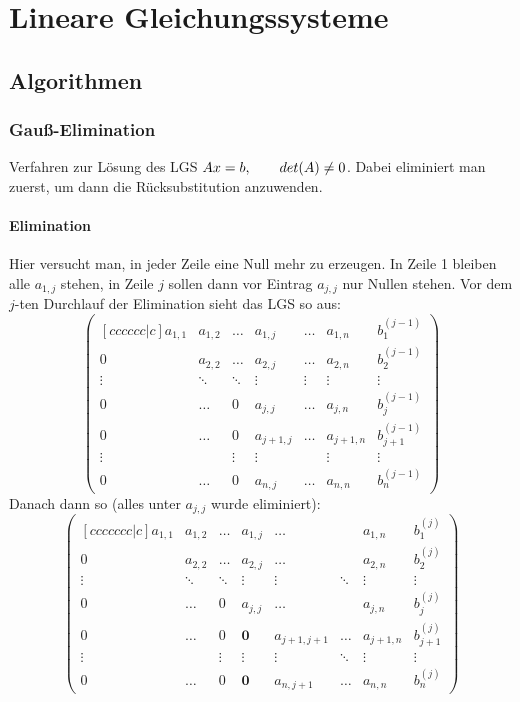 \section{Lineare Gleichungssysteme}
	\subsection{Algorithmen}
		\subsubsection{Gauß-Elimination}
			Verfahren zur Lösung des LGS $ Ax = b, \hspace*{7mm} det(A) \neq 0 $. Dabei eliminiert man zuerst, um dann die Rücksubstitution anzuwenden.
			
			\paragraph{Elimination} Hier versucht man, in jeder Zeile eine Null mehr zu erzeugen. In Zeile 1 bleiben alle $ a_{1,j} $ stehen, in Zeile $ j $ sollen dann vor Eintrag $ a_{j,j} $ nur Nullen stehen. Vor dem $j$-ten Durchlauf der Elimination sieht das LGS so aus:	
			$$ \begin{pmatrix}[cccccc|c]
			a_{1,1} & a_{1,2} & \dots & a_{1,j} & \dots & a_{1,n} & b_1^{(j-1)}\\
			0 & a_{2,2} & \dots & a_{2,j} & \dots & a_{2,n} & b_2^{(j-1)} \\
			\vdots & \ddots & \ddots & \vdots & \vdots & \vdots & \vdots \\
			0 & \dots & 0 & a_{j,j} & \dots & a_{j,n} & b_j^{(j-1)} \\
			0 & \dots & 0 & a_{j+1,j} & \dots & a_{j+1,n} & b_{j+1}^{(j-1)}\\
			\vdots &   & \vdots & \vdots &  & \vdots & \vdots\\
			0 & \dots & 0 & a_{n,j} & \dots & a_{n,n} & b_{n}^{(j-1)}
			\end{pmatrix} $$
			Danach dann so (alles unter $ a_{j,j} $ wurde eliminiert):
			$$ \begin{pmatrix}[ccccccc|c]
			a_{1,1} & a_{1,2} & \dots & a_{1,j} & \dots & & a_{1,n} & b_1^{(j)}\\
			0 & a_{2,2} & \dots & a_{2,j} & \dots & & a_{2,n} & b_2^{(j)} \\
			\vdots & \ddots & \ddots & \vdots & \vdots & \ddots & \vdots & \vdots \\
			0 & \dots & 0 & a_{j,j} & \dots & & a_{j,n} & b_j^{(j)} \\
			0 & \dots & 0 & \textbf{0} & a_{j+1,j+1} & \dots & a_{j+1,n} & b_{j+1}^{(j)}\\
			\vdots &   & \vdots & \vdots & \vdots  & \ddots & \vdots & \vdots\\
			0 & \dots & 0 & \textbf{0} & a_{n,j+1} & \dots & a_{n,n} & b_{n}^{(j)}
			\end{pmatrix} $$
